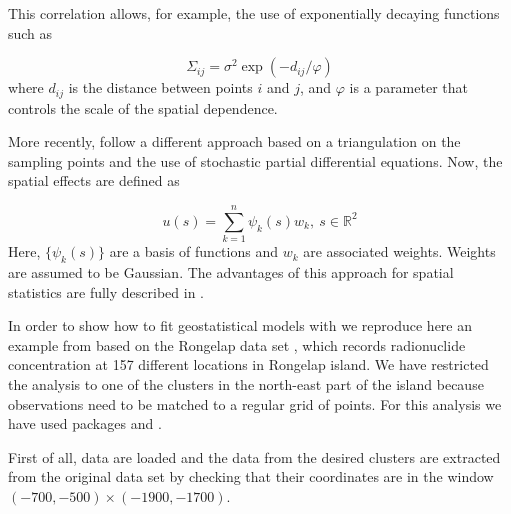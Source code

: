 \documentclass[article]{jss}
\begin{document}
This correlation allows, for example, the use of exponentially decaying
functions such as 

\begin{equation}
\Sigma_{ij} = \sigma^2 \exp(-d_{ij}/\varphi)
\end{equation}
\noindent
where $d_{ij}$ is the distance between points $i$ and $j$, and $\varphi$
is a parameter that controls the scale of the spatial dependence.


%
%
%



More recently, \citet{Lindgren:2011} follow a different approach based on
a triangulation on the sampling points and the use of stochastic partial
differential equations. Now, the spatial effects are defined as

\begin{equation}
u(s)=\sum_{k=1}^n \psi_k(s)w_k,\ s\in \mathbb{R}^2
\end{equation}
\noindent
Here, $\{\psi_k(s)\}$ are a basis of functions and $w_k$ are associated
weights. Weights are assumed to be Gaussian. The advantages of this approach
for spatial statistics are fully described in \citet{Camelettietal:2013}.


In order to show how to fit geostatistical models with  we
reproduce here an example from \citet{GomezRubioetal:2013} based on the
Rongelap data set \citep{DiggleRibeiro:2007}, which records  radionuclide
concentration at 157 different locations in Rongelap island. We have restricted
the analysis to one of the clusters in the north-east part of the island
because observations need to be matched to a regular grid of points.  For this
analysis we have used  packages  \citep{geoR:2001} and
 \citep{geoRglm:2002}.



First of all, data are loaded and the data from the desired clusters
are extracted from the original data set by checking that their coordinates
are in the window $(-700, -500)\times (-1900, -1700)$.
\end{document}
